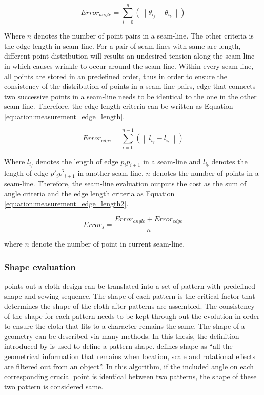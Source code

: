 \begin{equation}
Error_{angle} = \sum_{i=0}^{n}(\left \| \theta_{i_{f}} - \theta_{i_{b}} \right \|)
\label{equation:measurement_angle}
\end{equation}

Where $n$ denotes the number of point pairs in a seam-line. The other criteria is the edge length in seam-line. For a pair of seam-lines with same arc length, different point distribution will results an undesired tension along the seam-line in which causes wrinkle to occur around the seam-line. Within every seam-line, all points are stored in an predefined order, thus in order to ensure the consistency of the distribution of points in a seam-line pairs, edge that connects two successive points in a seam-line needs to be identical to the one in the other seam-line. Therefore, the edge length criteria can be written as Equation \ref{equation:measurement_edge_length}.

\begin{equation}
Error_{edge} = \sum_{i=0}^{n-1}(\left \| l_{i_{f}} - l_{i_{b}} \right \|)
\label{equation:measurement_edge_length}
\end{equation}

Where $l_{i_{f}}$ denotes the length of edge $\overline{p_{i}p_{i+1}}$ in a seam-line and $l_{i_{b}}$ denotes the length of edge $\overline{p'_{i}p'_{i+1}}$ in another seam-line. $n$ denotes the number of points in a seam-line. Therefore, the seam-line evaluation outputs the cost as the sum of angle criteria and the edge length criteria as Equation \ref{equation:measurement_edge_length2}.

\begin{equation}
Error_{s} = \frac{Error_{angle} + Error_{edge}}{n}    
\label{equation:measurement_edge_length2}
\end{equation}

where $n$ denote the number of point in current seam-line.

\subsubsection{Shape evaluation}

 points out a cloth design can be translated into a set of pattern with predefined shape and sewing sequence. The shape of each pattern is the critical factor that determines the shape of the cloth after patterns are assembled. The consistency of the shape for each pattern needs to be kept through out the evolution in order to ensure the cloth that fits to a character remains the same. The shape of a geometry can be described via many methods. In this thesis, the definition introduced by  is used to define a pattern shape.  defines shape as ``all the geometrical information that remains when location, scale and rotational effects are filtered out from an object''. In this algorithm, if the included angle on each corresponding crucial point is identical between two patterns, the shape of these two pattern is considered same. 


